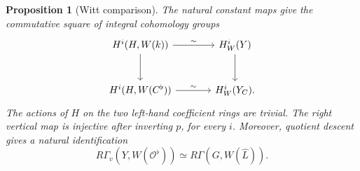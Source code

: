 \documentclass[11pt]{article}
\numberwithin{equation}{section}
\newtheorem{proposition}[theorem]{Proposition}
\theoremstyle{definition}
\theoremstyle{remark}
\newcommand{\cO}{\mathcal O}
\begin{document}
\begin{proposition}[Witt comparison]\label{prop:witt-comparison}
The natural constant maps give the commutative square of integral
cohomology groups
\begin{equation}\label{eq:witt-square}
\begin{tikzcd}[column sep=large,row sep=large]
 H^i(H,W(k)) \arrow[r,"\sim"] \arrow[d]
   & H_W^i(Y) \arrow[d]
   \\
 H^i(H,W(C^\flat)) \arrow[r,"\sim"]
   & H_W^i(Y_C).
\end{tikzcd}
\end{equation}
The actions of $H$ on the two left-hand coefficient rings are trivial.
The right vertical map is injective after inverting $p$, for every $i$.
Moreover, quotient descent gives a natural identification
\begin{equation}\label{eq:witt-group-identification}
 R\Gamma_v(Y,W(\cO^\flat))
   \simeq R\Gamma(G,W(\widehat L)).
\end{equation}
\end{proposition}
\end{document}
